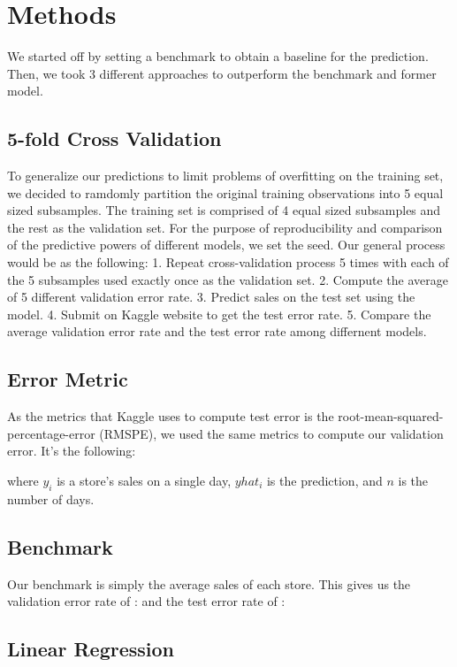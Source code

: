 \documentclass[letterpaper,twocolumn,10pt]{article}
\begin{document}



\section{Methods}
We started off by setting a benchmark to obtain a baseline for the prediction. Then, we took 3 different approaches to outperform the benchmark and former model.  

\subsection{5-fold Cross Validation} %
To generalize our predictions to limit problems of overfitting on the training set, we decided to ramdomly partition the original training observations into 5 equal sized subsamples. The training set is comprised of 4 equal sized subsamples and the rest as the validation set. For the purpose of reproducibility and comparison of the predictive powers of different models, we set the seed. Our general process would be as the following:
1. Repeat cross-validation process 5 times with each of the 5 subsamples used exactly once as the validation set.
2. Compute the average of 5 different validation error rate. 
3. Predict sales on the test set using the model. 
4. Submit on Kaggle website to get the test error rate.
5. Compare the average validation error rate and the test error rate among differnent models.


\subsection{Error Metric}
As the metrics that Kaggle uses to compute test error is the root-mean-squared-percentage-error (RMSPE), we used the same metrics to compute our validation error. It's the following:


where ${y_i}$ is a store's sales on a single day, ${yhat_i}$ is the prediction, and ${n}$ is the number of days. 

\subsection{Benchmark}
Our benchmark is simply the average sales of each store. This gives us the validation error rate of : and the test error rate of : 


\subsection{Linear Regression}
\end{document}
